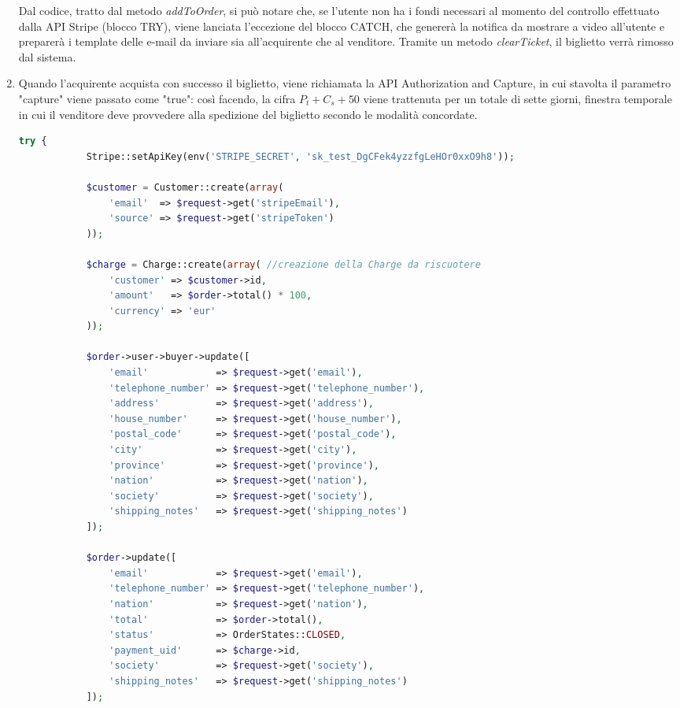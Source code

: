\begin{enumerate}
\begin{lstlisting}[language=PHP, caption={Trattenuta della cifra $P_{t} + C_{s} + 50$ sulla carta del venditore quando l'acquirente inserisce il biglietto nel carrello}]
\end{lstlisting}
Dal codice, tratto dal metodo \textit{addToOrder}, si può notare che, se l'utente non ha i fondi necessari al momento del controllo effettuato dalla API Stripe (blocco TRY), viene lanciata l'eccezione del blocco CATCH, che genererà la notifica da mostrare a video all'utente e preparerà i template delle e-mail da inviare sia all'acquirente che al venditore. Tramite un metodo \textit{clearTicket}, il biglietto verrà rimosso dal sistema.
\item Quando l'acquirente acquista con successo il biglietto, viene richiamata la API Authorization and Capture, in cui stavolta il parametro "capture" viene passato come "true": così facendo, la cifra $P_{t} + C_{s} + 50$ viene trattenuta per un totale di sette giorni, finestra temporale in cui il venditore deve provvedere alla spedizione del biglietto secondo le modalità concordate.
\begin{lstlisting}[language=PHP, caption={Metodo \textit{checkout} per completare l'acquisto}]
try {
			Stripe::setApiKey(env('STRIPE_SECRET', 'sk_test_DgCFek4yzzfgLeHOr0xxO9h8'));

			$customer = Customer::create(array(
				'email'  => $request->get('stripeEmail'),
				'source' => $request->get('stripeToken')
			));

			$charge = Charge::create(array( //creazione della Charge da riscuotere
				'customer' => $customer->id,
				'amount'   => $order->total() * 100,
				'currency' => 'eur'
			));

			$order->user->buyer->update([
				'email'            => $request->get('email'),
				'telephone_number' => $request->get('telephone_number'),
				'address'          => $request->get('address'),
				'house_number'     => $request->get('house_number'),
				'postal_code'      => $request->get('postal_code'),
				'city'             => $request->get('city'),
				'province'         => $request->get('province'),
				'nation'           => $request->get('nation'),
				'society'          => $request->get('society'),
				'shipping_notes'   => $request->get('shipping_notes')
			]);

			$order->update([
				'email'            => $request->get('email'),
				'telephone_number' => $request->get('telephone_number'),
				'nation'           => $request->get('nation'),
				'total'            => $order->total(),
				'status'           => OrderStates::CLOSED,
				'payment_uid'      => $charge->id,
				'society'          => $request->get('society'),
				'shipping_notes'   => $request->get('shipping_notes')
			]);


\end{lstlisting}
\end{enumerate}
